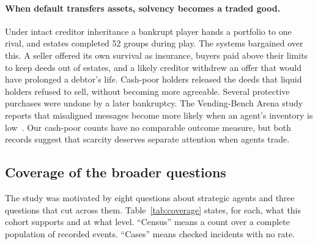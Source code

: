 \paragraph{When default transfers assets, solvency becomes a traded good.} Under intact creditor inheritance a bankrupt player hands a portfolio to one rival, and estates completed 52 groups during play. The systems bargained over this. A seller offered its own survival as insurance, buyers paid above their limits to keep deeds out of estates, and a likely creditor withdrew an offer that would have prolonged a debtor's life. Cash-poor holders released the deeds that liquid holders refused to sell, without becoming more agreeable. Several protective purchases were undone by a later bankruptcy. The Vending-Bench Arena study reports that misaligned messages become more likely when an agent's inventory is low~\cite{li2026arena}. Our cash-poor counts have no comparable outcome measure, but both records suggest that scarcity deserves separate attention when agents trade.

\subsection{Coverage of the broader questions}

The study was motivated by eight questions about strategic agents and three questions that cut across them. Table~\ref{tab:coverage} states, for each, what this cohort supports and at what level. ``Census'' means a count over a complete population of recorded events. ``Cases'' means checked incidents with no rate.

